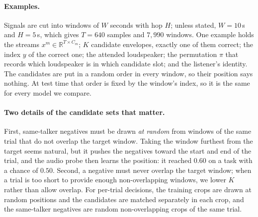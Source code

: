 \paragraph{Examples.}
Signals are cut into windows of $W$ seconds with hop $H$; unless stated,
$W\!=\!10$\,s and $H\!=\!5$\,s, which gives $T\!=\!640$ samples and $7{,}990$
windows. One example holds the streams $x^m\!\in\!\mathbb{R}^{T\times C_m}$; $K$
candidate envelopes, exactly one of them correct; the index $y$ of the correct
one; the attended loudspeaker; the permutation $\pi$ that records which
loudspeaker is in which candidate slot; and the listener's identity. The
candidates are put in a random order in every window, so their position says
nothing. At test time that order is fixed by the window's index, so it is the
same for every model we compare.

\paragraph{Two details of the candidate sets that matter.}
First, same-talker negatives must be drawn \emph{at random} from windows of the
same trial that do not overlap the target window. Taking the window furthest from
the target seems natural, but it pushes the negatives toward the start and end of
the trial, and the audio probe then learns the position: it reached $0.60$ on a
task with a chance of $0.50$. Second, a negative must never overlap the target
window; when a trial is too short to provide enough non-overlapping windows, we
lower $K$ rather than allow overlap. For per-trial decisions, the training crops
are drawn at random positions and the candidates are matched separately in each
crop, and the same-talker negatives are random non-overlapping crops of the same
trial.

